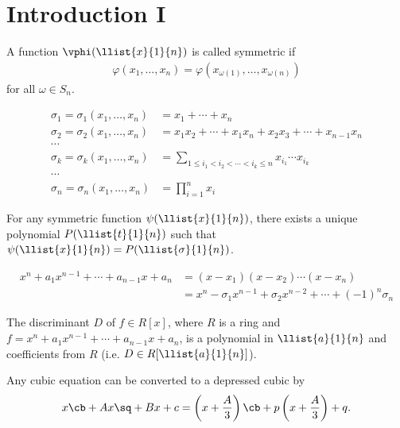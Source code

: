 \documentclass[a4paper]{article}
\begin{document}
\section{Introduction I}
\begin{tdefinition}
  A function $ \vphi(\llist{x}{1}{n}) $ is called symmetric if \begin{align*}
    \varphi(x_1,\ldots,x_n) = \varphi(x_{\omega(1)},\ldots,x_{\omega(n)})
  \end{align*}
  for all $ \omega\in S_n $.
\end{tdefinition}

\begin{tdefinition}
  \begin{align*}
    \sigma_1 = \sigma_1(x_1,\ldots,x_n) &= x_1+\cdots+x_n \\
    \sigma_2 = \sigma_2(x_1,\ldots,x_n) &= x_1x_2+\cdots+x_1x_n+x_2x_3+\cdots+x_{n-1}x_n \\
    \cdots \\
    \sigma_k = \sigma_k(x_1,\ldots,x_n)&=\sum\limits_{1\leq i_1<i_2<\cdots<i_k\leq n}x_{i_1}\cdots x_{i_k} \\
    \cdots \\
    \sigma_n = \sigma_n(x_1,\ldots,x_n)&=\prod\limits_{i=1}^n x_i
  \end{align*}
\end{tdefinition}

\begin{ttheorem}
  For any symmetric function $ \psi(\llist{x}{1}{n}) $, there exists a unique polynomial $ P(\llist{t}{1}{n}) $ such that $ \psi(\llist{x}{1}{n}) = P(\llist{\sigma}{1}{n}) $.
\end{ttheorem}

  \begin{align*}
    x^n+a_1x^{n-1}+\cdots + a_{n-1}x+a_n &= (x-x_1)(x-x_2)\cdots(x-x_n) \\
    &= x^n-\sigma_1x^{n-1} + \sigma_2 x^{n-2} + \cdots + (-1)^n\sigma_n
  \end{align*}

\begin{tcorollary}
  The discriminant $ D $ of $ f\in R[x] $, where $ R $ is a ring and $ f= x^n+a_1x^{n-1}+\cdots + a_{n-1}x+a_n$, is a polynomial in $ \llist{a}{1}{n} $ and coefficients from $ R $ (i.e. $ D \in R[\llist{a}{1}{n}] $).
\end{tcorollary}

 \quad
Any cubic equation can be converted to a depressed cubic by \begin{align*}
  x\cb+Ax\sq+Bx+c = \left(x+\frac{A}{3}\right)\cb + p\left(x+\frac{A}{3}\right) + q.
\end{align*}
\end{document}
